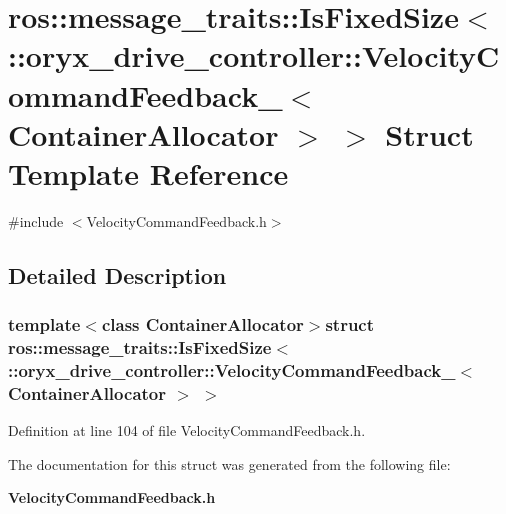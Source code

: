 \section{ros\-:\-:message\-\_\-traits\-:\-:\-Is\-Fixed\-Size$<$ \-:\-:oryx\-\_\-drive\-\_\-controller\-:\-:\-Velocity\-Command\-Feedback\-\_\-$<$ \-Container\-Allocator $>$ $>$ \-Struct \-Template \-Reference}
\label{structros_1_1message__traits_1_1IsFixedSize_3_01_1_1oryx__drive__controller_1_1VelocityCommandFe2d7fdcfd9c3dfafbe633980c6be68093}


{\ttfamily \#include $<$\-Velocity\-Command\-Feedback.\-h$>$}



\subsection{\-Detailed \-Description}
\subsubsection*{template$<$class Container\-Allocator$>$struct ros\-::message\-\_\-traits\-::\-Is\-Fixed\-Size$<$ \-::oryx\-\_\-drive\-\_\-controller\-::\-Velocity\-Command\-Feedback\-\_\-$<$ Container\-Allocator $>$ $>$}



\-Definition at line 104 of file \-Velocity\-Command\-Feedback.\-h.



\-The documentation for this struct was generated from the following file\-:\begin{DoxyCompactItemize}
\item 
{\bf \-Velocity\-Command\-Feedback.\-h}\end{DoxyCompactItemize}
